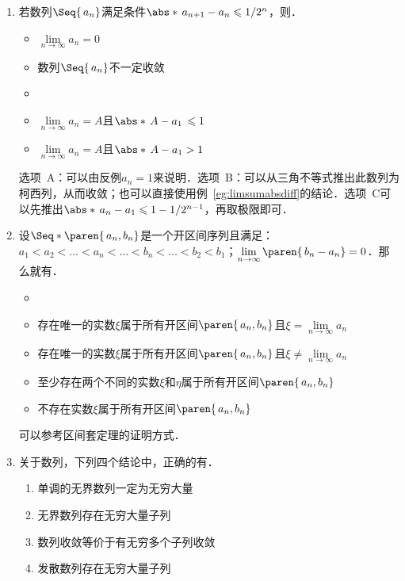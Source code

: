\begin{enumerate}
\item 若数列\(\Seq{\,a_n}\)满足条件\(\abs*{\,a_{n+1} - a_n} \le 1/2^n\)，则\uline{\makebox[6em]{}}．
  \begin{itemize}
    \renewcommand{\labelitemi}{\faCircleThin}
  \item \(\lim\limits_{n\to\infty} a_n = 0\)
  \item 数列\(\Seq{\,a_n}\)不一定收敛
    \ifshowsol
    \item[\faCircle]
    \else
    \item
    \fi
    \(\lim\limits_{n\to\infty} a_n = A\)且\(\abs*{\,A - a_1\,} \le 1\)
  \item \(\lim\limits_{n\to\infty} a_n = A\)且\(\abs*{\,A - a_1} > 1\)
  \end{itemize}

  \ifshowsol
    选项~A：可以由反例\(a_n = 1\)来说明．选项~B：可以从三角不等式推出此数列为柯西列，从而收敛；也可以直接使用例~\ref{eg:limsumabsdiff}的结论．选项~C可以先推出\(\abs*{\,a_n - a_1} \le 1 - 1/2^{n-1}\)，再取极限即可．
  \fi

\item 设\(\Seq*{\paren{\,a_n, b_n}}\)是一个开区间序列且满足：\(a_1 < a_2 < \dots < a_n < \dots < b_n < \dots < b_2 < b_1\)；\(\lim\limits_{n\to\infty} \paren{\,b_n - a_n} = 0\)．那么就有\uline{\makebox[10em]{}}．
  \begin{itemize}
    \renewcommand{\labelitemi}{\faCircleThin}
    \ifshowsol
    \item[\faCircle]
    \else
    \item
    \fi
    存在唯一的实数\(ξ\)属于所有开区间\(\paren{\,a_n, b_n}\)且\(ξ = \lim\limits_{n\to\infty} a_n\)
  \item 存在唯一的实数\(ξ\)属于所有开区间\(\paren{\,a_n, b_n}\)且\(ξ \ne \lim\limits_{n\to\infty} a_n\)
  \item 至少存在两个不同的实数\(ξ\)和\(η\)属于所有开区间\(\paren{\,a_n, b_n}\)
  \item 不存在实数\(ξ\)属于所有开区间\(\paren{\,a_n, b_n}\)
  \end{itemize}

  \ifshowsol
    可以参考区间套定理的证明方式．
  \fi

\item 关于数列，下列四个结论中，正确的有\uline{}．
  \begin{enumerate}
    \renewcommand{\labelenumii}{\enumparen{\arabic{enumii}}}
  \item 单调的无界数列一定为无穷大量
  \item 无界数列存在无穷大量子列
  \item 数列收敛等价于有无穷多个子列收敛
  \item 发散数列存在无穷大量子列
  \end{enumerate}


\end{enumerate}
